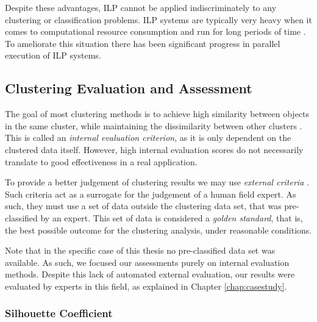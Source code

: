 Despite these advantages, ILP cannot be applied indiscriminately to any
clustering or classification problems. ILP systems are typically very heavy when
it comes to computational resource consumption and run for long periods of time
\cite{fonseca2003implementation}. To ameliorate this situation there has been
significant progress in parallel execution of ILP systems.

\subsection{Clustering Evaluation and Assessment}\label{sec:clustereval}

The goal of most clustering methods is to achieve high similarity between
objects in the same cluster, while maintaining the dissimilarity between other
clusters \cite{Manning:2008:IIR:1394399}. This is called an \emph{internal
evaluation criterion}, as it is only dependent on the clustered data itself.
However, high internal evaluation scores do not necessarily translate to good
effectiveness in a real application.

To provide a better judgement of clustering results we may use \emph{external
criteria} \cite{Manning:2008:IIR:1394399}. Such criteria act as a surrogate for
the judgement of a human field expert. As such, they must use a set of data
outside the clustering data set, that was pre-classified by an expert. This set
of data is considered a \emph{golden standard}, that is, the best possible outcome for
the clustering analysis, under reasonable conditions.

Note that in the specific case of this thesis no pre-classified data set was
available. As such, we focused our assessments purely on internal evaluation
methods. Despite this lack of automated external evaluation, our results were
evaluated by experts in this field, as explained in Chapter \ref{chap:casestudy}.

\subsubsection*{Silhouette Coefficient}

